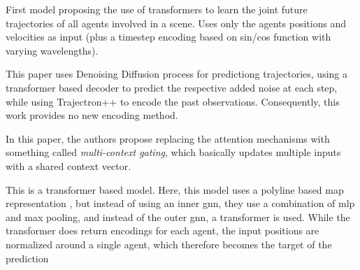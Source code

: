 \cite{yuan2021agentformer} First model proposing the use of transformers to learn the joint future trajectories of all agents involved in a scene. Uses only the agents positions and velocities as input (plus a timestep encoding based on sin/cos function with varying wavelengths). 



\cite{navarro2022social}


\cite{gu2022stochastic} This paper uses Denoising Diffusion process for predictiong trajectories, using a transformer based decoder to predict the respective added noise at each step, while using Trajectron++ to encode the past observations. Consequently, this work provides no new encoding method.


\cite{varadarajan2022multipath} In this paper, the authors propose replacing the attention mechanisms with something called \textit{multi-context gating}, which basically updates multiple inputs with a shared context vector.


\cite{shi2022motion} This is a transformer based model. Here, this model uses a polyline based map representation \cite{gao2020vectornet}, but instead of using an inner gnn, they use a combination of mlp and max pooling, and instead of the outer gnn, a transformer is used. While the transformer does return encodings for each agent, the input positions are normalized around a single agent, which therefore becomes the target of the prediction



\cite{zhou2023csr}


\cite{peng2023mrgtraj}


